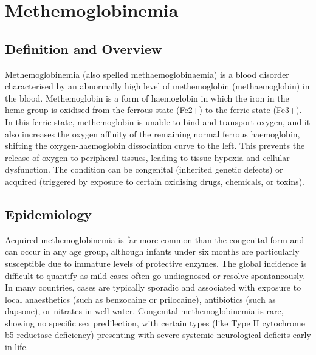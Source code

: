 \chapter{Methemoglobinemia}

\section*{Definition and Overview}
Methemoglobinemia (also spelled methaemoglobinaemia) is a blood disorder characterised by an abnormally high level of methemoglobin (methaemoglobin) in the blood. Methemoglobin is a form of haemoglobin in which the iron in the heme group is oxidised from the ferrous state (Fe2+) to the ferric state (Fe3+). In this ferric state, methemoglobin is unable to bind and transport oxygen, and it also increases the oxygen affinity of the remaining normal ferrous haemoglobin, shifting the oxygen-haemoglobin dissociation curve to the left. This prevents the release of oxygen to peripheral tissues, leading to tissue hypoxia and cellular dysfunction. The condition can be congenital (inherited genetic defects) or acquired (triggered by exposure to certain oxidising drugs, chemicals, or toxins).

\section*{Epidemiology}
Acquired methemoglobinemia is far more common than the congenital form and can occur in any age group, although infants under six months are particularly susceptible due to immature levels of protective enzymes. The global incidence is difficult to quantify as mild cases often go undiagnosed or resolve spontaneously. In many countries, cases are typically sporadic and associated with exposure to local anaesthetics (such as benzocaine or prilocaine), antibiotics (such as dapsone), or nitrates in well water. Congenital methemoglobinemia is rare, showing no specific sex predilection, with certain types (like Type II cytochrome b5 reductase deficiency) presenting with severe systemic neurological deficits early in life.

